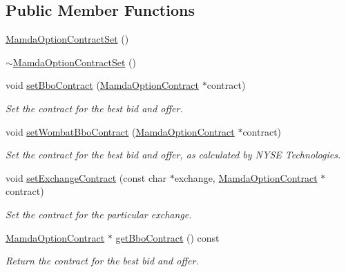 \subsection*{Public Member Functions}
\begin{CompactItemize}
\item 
\hyperlink{classWombat_1_1MamdaOptionContractSet_4d7fca2711028aea1020f1ad45bf292c}{Mamda\-Option\-Contract\-Set} ()
\item 
\hyperlink{classWombat_1_1MamdaOptionContractSet_b936965d38c1d42183634eb785276a67}{$\sim$Mamda\-Option\-Contract\-Set} ()
\item 
void \hyperlink{classWombat_1_1MamdaOptionContractSet_d5ed4d66ce4e34d8b143245cb5ca6473}{set\-Bbo\-Contract} (\hyperlink{classWombat_1_1MamdaOptionContract}{Mamda\-Option\-Contract} $\ast$contract)
\begin{CompactList}\small\item\em Set the contract for the best bid and offer. \item\end{CompactList}\item 
void \hyperlink{classWombat_1_1MamdaOptionContractSet_360ce213c19a6db9d21e0a63fe8b78f8}{set\-Wombat\-Bbo\-Contract} (\hyperlink{classWombat_1_1MamdaOptionContract}{Mamda\-Option\-Contract} $\ast$contract)
\begin{CompactList}\small\item\em Set the contract for the best bid and offer, as calculated by NYSE Technologies. \item\end{CompactList}\item 
void \hyperlink{classWombat_1_1MamdaOptionContractSet_03643ebac542997c30111732754c485c}{set\-Exchange\-Contract} (const char $\ast$exchange, \hyperlink{classWombat_1_1MamdaOptionContract}{Mamda\-Option\-Contract} $\ast$contract)
\begin{CompactList}\small\item\em Set the contract for the particular exchange. \item\end{CompactList}\item 
\hyperlink{classWombat_1_1MamdaOptionContract}{Mamda\-Option\-Contract} $\ast$ \hyperlink{classWombat_1_1MamdaOptionContractSet_e643beece623c917a6b496ce2152217b}{get\-Bbo\-Contract} () const 
\begin{CompactList}\small\item\em Return the contract for the best bid and offer. \item\end{CompactList}\item 

\end{CompactItemize}

